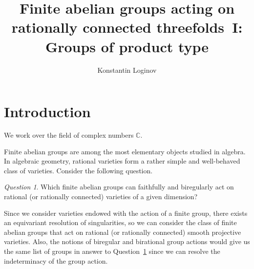 \documentclass[11pt]{amsart}
\title{Finite abelian groups acting on rationally connected threefolds~I: Groups of product type}
\author{Konstantin Loginov}
\numberwithin{equation}{section}
\theoremstyle{definition}
\theoremstyle{remark}
\newtheorem{question}[thm]{Question}
\begin{document}


\maketitle


\begin{prelims}

\DisplayAbstractInEnglish

\bigskip

\DisplayKeyWords

\medskip

\DisplayMSCclass

\end{prelims}



\newpage

\setcounter{tocdepth}{1}

\tableofcontents





\section{Introduction}
We work over the field of complex numbers $\mathbb{C}$. 

Finite abelian groups are among the most elementary objects studied in algebra. In algebraic geometry, rational varieties form a rather simple and well-behaved class of varieties. Consider the following question. 

\begin{question}
\label{main-question}
Which finite abelian groups can faithfully and biregularly act on rational (or rationally connected) varieties of a given dimension? 
\end{question}

Since we consider varieties endowed with the action of a finite group, there exists an equivariant resolution of singularities, so we can consider the class of finite abelian groups that act on rational (or rationally connected) smooth projective varieties. Also,  the notions of biregular and birational group actions would give us the same list of groups in answer to Question~\ref{main-question} since we can resolve the indeterminacy of the group action.
\end{document}

